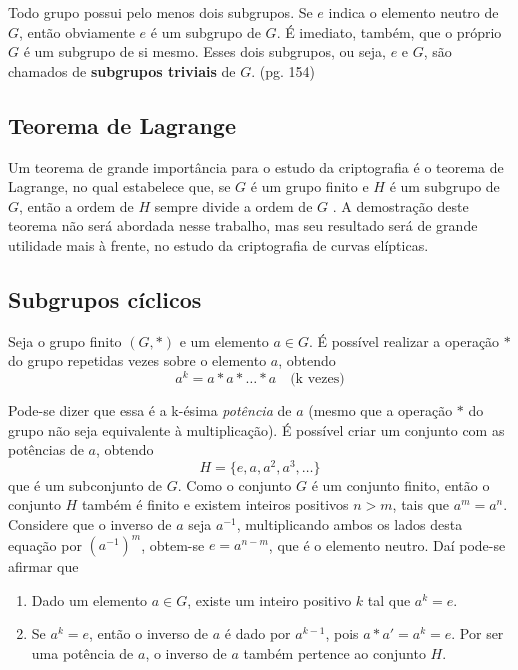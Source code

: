 Todo grupo possui pelo menos dois subgrupos. Se \(e\) indica o elemento neutro de \(G\), então obviamente \(e\) é um subgrupo de \(G\). É imediato, também, que o próprio \(G\) é um subgrupo de si mesmo. Esses dois subgrupos, ou seja, \(e\) e \(G\), são chamados de \textbf{subgrupos triviais} de \(G\). \cite{Domingues:2003} (pg. 154)

%
%
\subsection{Teorema de Lagrange}
Um teorema de grande importância para o estudo da criptografia é o teorema de Lagrange, no qual estabelece que, se \(G\) é um grupo finito e \(H\) é um subgrupo de \(G\), então a ordem de \(H\) sempre divide a ordem de \(G\) \cite{Shoup:2005}. A demostração deste teorema não será abordada nesse trabalho, mas seu resultado será de grande utilidade mais à frente, no estudo da criptografia de curvas elípticas.

%
%

%
%
\subsection{Subgrupos cíclicos}
Seja o grupo finito $(G,*)$ e um elemento $a \in G$. É possível realizar a operação $*$ do grupo repetidas vezes sobre o elemento $a$, obtendo
$$
a^k = a * a * \ldots * a \quad\mbox{(k vezes)}
$$

Pode-se dizer que essa é a k-ésima \textit{potência} de $a$ (mesmo que a operação $*$ do grupo não seja equivalente à multiplicação). É possível criar um conjunto com as potências de $a$, obtendo
$$
H = \{e, a, a^2, a^3, \ldots\}
$$
que é um subconjunto de $G$. Como o conjunto $G$ é um conjunto finito, então o conjunto $H$ também é finito e existem inteiros positivos $n > m$, tais que $a^m = a^n$. Considere que o inverso de $a$ seja $a^{-1}$, multiplicando ambos os lados desta equação por $(a^{-1})^m$, obtem-se $e = a^{n-m}$, que é o elemento neutro.\cite{Coutinho:2014} Daí pode-se afirmar que
\begin{enumerate}
\item Dado um elemento $a \in G$, existe um inteiro positivo $k$ tal que $a^k = e$.
\item Se $a^k = e$, então o inverso de $a$ é dado por $a^{k-1}$, pois $a * a' = a^k = e$. Por ser uma potência de $a$, o inverso de $a$ também pertence ao conjunto $H$.
\end{enumerate}

